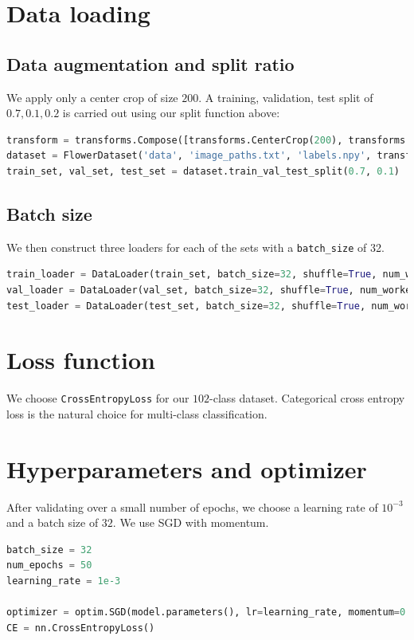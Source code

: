 \documentclass[twocolumn,9pt]{article}
\begin{document}
\section{Data loading}
\subsection*{Data augmentation and split ratio}
We apply only a center crop of size $200$. A training, validation, test split of
$0.7, 0.1, 0.2$ is carried out using our split function above:
\begin{lstlisting}[language=Python]
transform = transforms.Compose([transforms.CenterCrop(200), transforms.ToTensor()])
dataset = FlowerDataset('data', 'image_paths.txt', 'labels.npy', transform=transform)
train_set, val_set, test_set = dataset.train_val_test_split(0.7, 0.1)
\end{lstlisting}

\subsection*{Batch size}
We then construct three loaders for each of the sets with a \lstinline{batch_size} of 32.
\begin{lstlisting}[language=Python]
train_loader = DataLoader(train_set, batch_size=32, shuffle=True, num_workers=4)
val_loader = DataLoader(val_set, batch_size=32, shuffle=True, num_workers=4)
test_loader = DataLoader(test_set, batch_size=32, shuffle=True, num_workers=4)
\end{lstlisting}

\section{Loss function}
We choose \lstinline{CrossEntropyLoss} for our $102$-class dataset. Categorical cross entropy
loss is the natural choice for multi-class classification.

\section{Hyperparameters and optimizer}
After validating over a small number of epochs, we choose a learning rate of $10^{-3}$ and a
batch size of $32$. We use SGD with momentum.
\begin{lstlisting}[language=Python]
batch_size = 32
num_epochs = 50
learning_rate = 1e-3

optimizer = optim.SGD(model.parameters(), lr=learning_rate, momentum=0.9)
CE = nn.CrossEntropyLoss()
\end{lstlisting}
\end{document}
